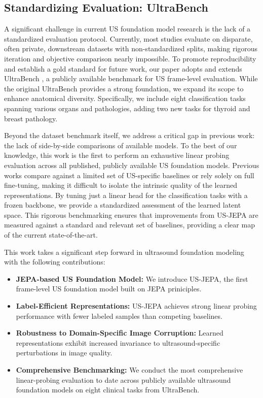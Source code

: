 \documentclass{article}
\theoremstyle{plain}
\theoremstyle{definition}
\theoremstyle{remark}
\begin{document}
\subsection{Standardizing Evaluation: UltraBench}

A significant challenge in current US foundation model research is the lack of a standardized evaluation protocol. Currently, most studies evaluate on disparate, often private, downstream datasets with non-standardized splits, making rigorous iteration and objective comparison nearly impossible. To promote reproducibility and establish a gold standard for future work, our paper adopts and extends UltraBench \cite{tupper_revisiting_nodate}, a publicly available benchmark for US frame-level evaluation. While the original UltraBench provides a strong foundation, we expand its scope to enhance anatomical diversity. Specifically, we include eight classification tasks spanning various organs and pathologies, adding two new tasks for thyroid and breast pathology.

Beyond the dataset benchmark itself, we address a critical gap in previous work: the lack of side-by-side comparisons of available models. To the best of our knowledge, this work is the first to perform an exhaustive linear probing evaluation across all published, publicly available US foundation models. Previous works compare against a limited set of US-specific baselines or rely solely on full fine-tuning, making it difficult to isolate the intrinsic quality of the learned representations. By tuning just a linear head for the classification tasks with a frozen backbone, we provide a standardized assessment of the learned latent space. This rigorous benchmarking ensures that improvements from US-JEPA are measured against a standard and relevant set of baselines, providing a clear map of the current state-of-the-art.

This work takes a significant step forward in ultrasound foundation modeling with the following contributions:
\begin{itemize}
    \itemsep0em
    \item \textbf{JEPA-based US Foundation Model:} We introduce US-JEPA, the first frame-level US foundation model built on JEPA priniciples.
    \item \textbf{Label-Efficient Representations:} US-JEPA achieves strong linear probing performance with fewer labeled samples than competing baselines.
    \item \textbf{Robustness to Domain-Specific Image Corruption:} Learned representations exhibit increased invariance to ultrasound-specific perturbations in image quality.
    \item \textbf{Comprehensive Benchmarking:} We conduct the most comprehensive linear-probing evaluation to date across publicly available ultrasound foundation models on eight clinical tasks from UltraBench.
\end{itemize}
\end{document}
